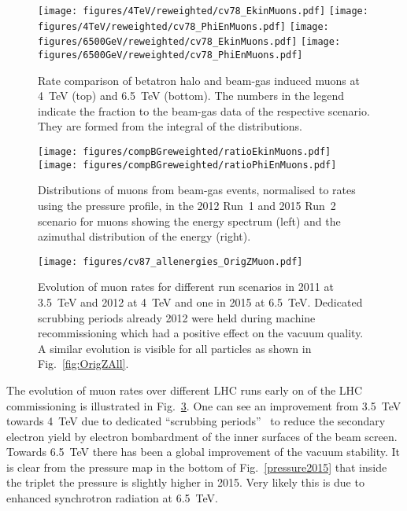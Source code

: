 \begin{figure}
\begin{center}
  \texttt{[image: figures/4TeV/reweighted/cv78\_EkinMuons.pdf]}
  \texttt{[image: figures/4TeV/reweighted/cv78\_PhiEnMuons.pdf]}
  \texttt{[image: figures/6500GeV/reweighted/cv78\_EkinMuons.pdf]}
  \texttt{[image: figures/6500GeV/reweighted/cv78\_PhiEnMuons.pdf]}
\end{center}
\vspace{-0.6cm}
 \caption{Rate comparison of betatron halo and beam-gas induced muons at 4~TeV (top) and 6.5~TeV (bottom). The numbers in the legend indicate the fraction to the beam-gas data of the respective scenario. They are formed from the integral of the distributions.
  \label{compAllBKG_run12}}
\end{figure}

\begin{figure}%
\centering

\texttt{[image: figures/compBGreweighted/ratioEkinMuons.pdf]}
\texttt{[image: figures/compBGreweighted/ratioPhiEnMuons.pdf]}
\caption{Distributions of muons from beam-gas events, normalised to rates using the pressure profile, in the 2012 Run~1 and 2015 Run~2 scenario for muons showing the energy spectrum (left) and the azimuthal distribution of the energy (right).
  \label{fig:compBGreweighted1}}
\end{figure}


\begin{figure}
\begin{center}
  \texttt{[image: figures/cv87\_allenergies\_OrigZMuon.pdf]}
\end{center}
\vspace{-0.6cm}
 \caption{Evolution of muon rates for different run scenarios in 2011 at 3.5~TeV and 2012 at 4~TeV and one in 2015 at 6.5~TeV. Dedicated scrubbing periods already 2012 were held during machine recommissioning which had a positive effect on the vacuum quality. A similar evolution is visible for all particles as shown in Fig.~\ref{fig:OrigZAll}.
  \label{fig:OrigZMuon}} 
\end{figure}


The evolution of muon rates over different LHC runs early on of the LHC commissioning is illustrated in Fig.~\ref{fig:OrigZMuon}. One can see an improvement from 3.5~TeV towards 4~TeV due to dedicated ``scrubbing periods''~\cite{iadarolaEvian2012} to reduce the secondary electron yield by electron bombardment of the inner surfaces of the beam screen. Towards 6.5~TeV there has been a global improvement of the vacuum stability. It is clear from the pressure map in the bottom of Fig.~\ref{pressure2015} that inside the triplet the pressure is slightly higher in 2015. Very likely this is due to enhanced synchrotron radiation at 6.5~TeV. 

